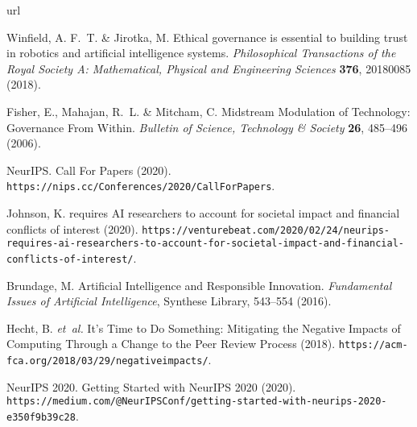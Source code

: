 \documentclass[11pt,english]{article}
\begin{document}
\begin{thebibliography}{10}
\expandafter\ifx\csname url\endcsname\relax
\def\url#1{\texttt{#1}}\fi
\providecommand{\bibinfo}[2]{#2}
\providecommand{\eprint}[2][]{\url{#2}}

\bibinfo{author}{Winfield, A. F.~T.} \& \bibinfo{author}{Jirotka, M.}
\newblock \bibinfo{title}{Ethical governance is essential to building trust in
robotics and artificial intelligence systems}.
\newblock \emph{\bibinfo{journal}{Philosophical Transactions of the Royal
Society A: Mathematical, Physical and Engineering Sciences}}
\textbf{\bibinfo{volume}{376}}, \bibinfo{pages}{20180085}
(\bibinfo{year}{2018}).

\bibinfo{author}{Fisher, E.}, \bibinfo{author}{Mahajan, R.~L.} \&
\bibinfo{author}{Mitcham, C.}
\newblock \bibinfo{title}{Midstream {Modulation} of {Technology}: {Governance}
{From} {Within}}.
\newblock \emph{\bibinfo{journal}{Bulletin of Science, Technology \& Society}}
\textbf{\bibinfo{volume}{26}}, \bibinfo{pages}{485--496}
(\bibinfo{year}{2006}).

\bibinfo{author}{NeurIPS}.
\newblock \bibinfo{title}{Call {For} {Papers}} (\bibinfo{year}{2020}).
\newblock \url{https://nips.cc/Conferences/2020/CallForPapers}.

\bibinfo{author}{Johnson, K.}
\newblock \bibinfo{title}{{NeurIPS} requires {AI} researchers to account for
societal impact and financial conflicts of interest} (\bibinfo{year}{2020}).
\newblock
\url{https://venturebeat.com/2020/02/24/neurips-requires-ai-researchers-to-account-for-societal-impact-and-financial-conflicts-of-interest/}.

\bibinfo{author}{Brundage, M.}
\newblock \bibinfo{title}{Artificial {Intelligence} and {Responsible}
{Innovation}}.
\emph{\bibinfo{booktitle}{Fundamental {Issues} of {Artificial}
{Intelligence}}}, Synthese {Library}, \bibinfo{pages}{543--554}
(\bibinfo{year}{2016}).

\bibinfo{author}{Hecht, B.} \emph{et~al.}
\newblock \bibinfo{title}{It's {Time} to {Do} {Something}: {Mitigating} the
{Negative} {Impacts} of {Computing} {Through} a {Change} to the {Peer}
{Review} {Process}} (\bibinfo{year}{2018}).
\newblock \url{https://acm-fca.org/2018/03/29/negativeimpacts/}.

\bibinfo{author}{NeurIPS 2020}.
\newblock \bibinfo{title}{Getting {Started} with {NeurIPS} 2020}
(\bibinfo{year}{2020}).
\newblock
\url{https://medium.com/@NeurIPSConf/getting-started-with-neurips-2020-e350f9b39c28}.


\end{thebibliography}
\end{document}
